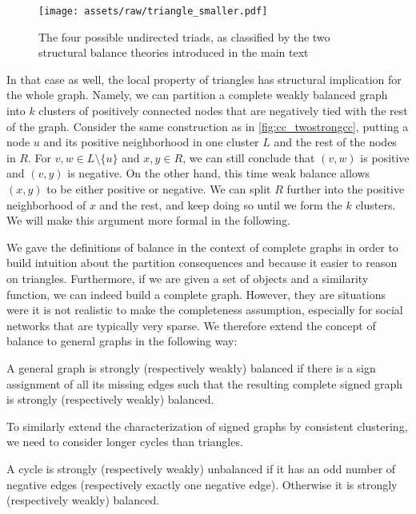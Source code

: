 \begin{figure}[htpb]
	\centering
	\texttt{[image: assets/raw/triangle\_smaller.pdf]}
	\caption{The four possible undirected triads, as classified by the two structural balance theories
	introduced in the main text} \label{fig:cc_balance}
\end{figure}

In that case as well, the local property of triangles has structural implication for the whole graph.
Namely, we can partition a complete weakly balanced graph into $k$ clusters of positively connected
nodes that are negatively tied with the rest of the graph. Consider the same construction as in
\autoref{fig:cc_twostrongcc}, putting a node $u$ and its positive neighborhood in one cluster $L$ and
the rest of the nodes in $R$. For $v,w\in L\setminus \{u\}$ and $x,y\in R$, we can still conclude
that $(v,w)$ is positive and $(v,y)$ is negative. On the other hand, this time weak balance allows
$(x,y)$ to be either positive or negative. We can split $R$ further into the positive neighborhood of
$x$ and the rest, and keep doing so until we form the $k$ clusters. We will make this argument more
formal in the following.

We gave the definitions of balance in the context of complete graphs in order to build intuition
about the partition consequences and because it easier to reason on triangles. Furthermore, if we are
given a set of objects and a similarity function, we can indeed build a complete graph. However,
they are situations were it is not realistic to make the completeness assumption, especially for
social networks that are typically very sparse. We therefore extend the concept of balance to
general graphs in the following way:
\begin{definition}
	A general graph is strongly (respectively weakly) balanced if there is a sign assignment of all its
	missing edges such that the resulting complete signed graph is strongly (respectively weakly)
	balanced.
\end{definition}
To similarly extend the characterization of signed graphs by consistent clustering, we need to
consider longer cycles than triangles.
\begin{definition}
	A cycle is strongly (respectively weakly) unbalanced if it has an odd number of negative edges
	(respectively exactly one negative edge). Otherwise it is strongly (respectively weakly) balanced.
\end{definition}

